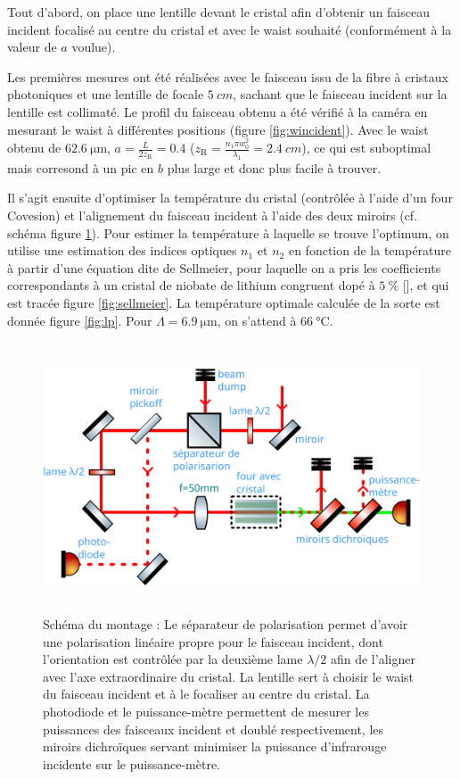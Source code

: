 \documentclass[11pt,a4paper]{article}
\newcommand{\ncite}[1]{[\citenum{#1}]}
\newcommand{\zr}{z_\mathsc{R}}
\newcommand{\mathsc}[1]{\mathrm{\scriptscriptstyle {#1}}}
\begin{document}
Tout d'abord, on place une lentille devant le cristal afin d'obtenir un faisceau incident focalisé au centre du cristal et avec le waist souhaité (conformément à la valeur de $a$ voulue).

Les premières mesures ont été réalisées avec le faisceau issu de la fibre à cristaux photoniques et une lentille de focale $\SI{5}{cm}$, sachant que le faisceau incident sur la lentille est collimaté. Le profil du faisceau obtenu a été vérifié à la caméra en mesurant le waist à différentes positions (figure \ref{fig:wincident}). Avec le waist obtenu de $\SI{62.6}{\micro\meter}$, $a=\frac{L}{2\zr}=0.4$ ($\zr = \frac{n_1 \pi w_0^2}{\lambda_1} = \SI{2.4}{cm}$), 
 ce qui est suboptimal mais corresond à un pic en $b$ plus large et donc plus facile à trouver.

 Il s'agit ensuite d'optimiser la température du cristal (contrôlée à l'aide d'un four Covesion) et l'alignement du faisceau incident à l'aide des deux miroirs (cf. schéma figure \ref{fig:montage}). Pour estimer la température à laquelle se trouve l'optimum, on utilise une estimation des indices optiques $n_1$ et $n_2$ en fonction de la température à partir d'une équation dite de Sellmeier, pour laquelle on a pris les coefficients correspondants à un cristal de niobate de lithium congruent dopé à $\SI{5}{\percent}$ \ncite{gayer,covesion}, et qui est tracée figure \ref{fig:sellmeier}. La température optimale calculée de la sorte est donnée figure \ref{fig:lp}. Pour $\Lambda = \SI{6.9}{\micro\meter}$, on s'attend à $\SI{66}{\celsius}$.

\begin{figure}[h]
	\centering
	\includegraphics[height=8cm]{./img/schema.pdf}
	\caption{Schéma du montage : \small Le séparateur de polarisation permet d'avoir une polarisation linéaire propre pour le faisceau incident, dont l'orientation est contrôlée par la deuxième lame $\lambda / 2$ afin de l'aligner avec l'axe extraordinaire du cristal. La lentille sert à choisir le waist du faisceau incident et à le focaliser au centre du cristal. La photodiode et le puissance-mètre permettent de mesurer les puissances des faisceaux incident et doublé respectivement, les miroirs dichroïques servant minimiser la puissance d'infrarouge incidente sur le puissance-mètre.} %
\label{fig:montage}
\end{figure}
\end{document}
